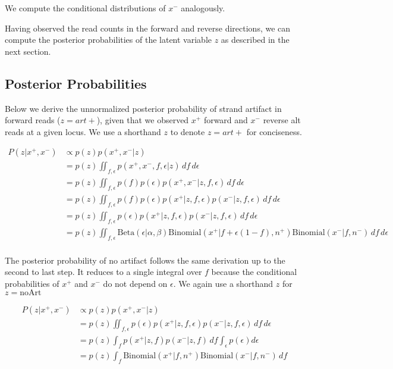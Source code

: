 \documentclass[a4paper]{article}
\begin{document}
We compute the conditional distributions of $x^-$  analogously.

Having observed the read counts in the forward and reverse directions, we can compute the posterior probabilities of the latent variable $z$ as described in the next section.

\subsection{Posterior Probabilities}

Below we derive the unnormalized posterior probability of strand artifact in forward reads ($z = art+$), given that we observed $x^+$ forward and $x^-$ reverse alt reads at a given locus. We use a shorthand $z$ to denote $z=art+$ for conciseness. 

\begin{equation}
\begin{split}
P(z |x^+, x^-) & \propto p(z) p(x^+, x^- | z) \\
& = p(z) \iint_{f, \epsilon}  p(x^+, x^-, f, \epsilon | z) \,df\,d\epsilon \\
& = p(z) \iint_{f, \epsilon}  p(f) p(\epsilon) p(x^+, x^- | z, f, \epsilon) \,df\,d\epsilon \\
& = p(z) \iint_{f, \epsilon}  p(f) p(\epsilon) p(x^+ | z, f, \epsilon) p(x^- | z, f, \epsilon) \,df\,d\epsilon \\
& = p(z) \iint_{f, \epsilon}  p(\epsilon) p(x^+ | z, f, \epsilon) p(x^- | z, f, \epsilon) \,df\,d\epsilon \\
& = p(z) \iint_{f, \epsilon}  \mathrm{Beta}(\epsilon|\alpha, \beta) \mathrm{Binomial}(x^+ | f + \epsilon(1-f), n^+) \mathrm{Binomial}(x^- | f, n^-) \,df\,d\epsilon \\
\end{split}
\end{equation}

The posterior probability of no artifact follows the same derivation up to the second to last step. It reduces to a single integral over $f$ because the conditional probabilities of $x^+$ and $x^-$ do not depend on $\epsilon$. We again use a shorthand $z$ for $z=\mathrm{noArt}$

\begin{equation}
\begin{split}
P(z |x^+, x^-) & \propto p(z) p(x^+, x^- | z) \\
		    & = p(z) \iint_{f, \epsilon}  p(\epsilon) p(x^+ | z, f, \epsilon) p(x^- | z, f, \epsilon) \,df\,d\epsilon \\
		    & = p(z) \int_{f}  p(x^+ | z, f) p(x^- | z, f) \,df \int_{\epsilon}  p(\epsilon) d\epsilon \\
                     & = p(z) \int_{f}  \mathrm{Binomial}(x^+ | f, n^+) \mathrm{Binomial}(x^- | f, n^-) \,df \\
\end{split}
\end{equation}
\end{document}
